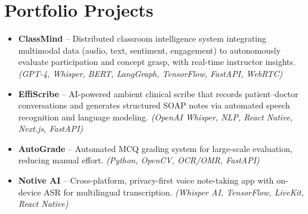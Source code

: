 \documentclass[11pt,a4paper]{article}
\begin{document}
\section*{Portfolio Projects}
\begin{itemize}
    \item \textbf{ClassMind} -- Distributed classroom intelligence system integrating multimodal data
          (audio, text, sentiment, engagement) to autonomously evaluate participation and concept
          grasp, with real-time instructor insights. \textit{(GPT-4, Whisper, BERT, LangGraph,
          TensorFlow, FastAPI, WebRTC)}
    \item \textbf{EffiScribe} -- AI-powered ambient clinical scribe that records patient--doctor
          conversations and generates structured SOAP notes via automated speech recognition and
          language modeling. \textit{(OpenAI Whisper, NLP, React Native, Next.js, FastAPI)}
    \item \textbf{AutoGrade} -- Automated MCQ grading system for large-scale evaluation, reducing
          manual effort. \textit{(Python, OpenCV, OCR/OMR, FastAPI)}
    \item \textbf{Notive AI} -- Cross-platform, privacy-first voice note-taking app with on-device ASR
          for multilingual transcription. \textit{(Whisper AI, TensorFlow, LiveKit, React Native)}
\end{itemize}

\end{document}
